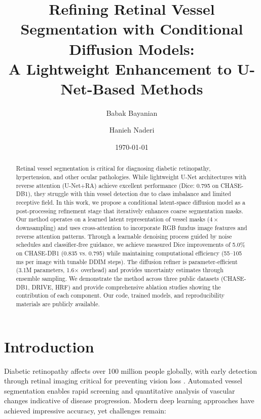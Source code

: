 \documentclass[11pt]{article}
\title{Refining Retinal Vessel Segmentation with Conditional Diffusion Models: \\
A Lightweight Enhancement to U-Net-Based Methods}
\author{Babak Bayanian \and Hanieh Naderi}
\date{\today}
\begin{document}
\maketitle

\begin{abstract}
Retinal vessel segmentation is critical for diagnosing diabetic retinopathy, hypertension, and other ocular pathologies. While lightweight U-Net architectures with reverse attention (U-Net+RA) achieve excellent performance (Dice: 0.795 on CHASE-DB1), they struggle with thin vessel detection due to class imbalance and limited receptive field. In this work, we propose a conditional latent-space diffusion model as a post-processing refinement stage that iteratively enhances coarse segmentation masks. Our method operates on a learned latent representation of vessel masks ($4\times$ downsampling) and uses cross-attention to incorporate RGB fundus image features and reverse attention patterns. Through a learnable denoising process guided by noise schedules and classifier-free guidance, we achieve measured Dice improvements of 5.0\% on CHASE-DB1 (0.835 vs. 0.795) while maintaining computational efficiency (55--105 ms per image with tunable DDIM steps). The diffusion refiner is parameter-efficient (3.1M parameters, 1.6$\times$ overhead) and provides uncertainty estimates through ensemble sampling. We demonstrate the method across three public datasets (CHASE-DB1, DRIVE, HRF) and provide comprehensive ablation studies showing the contribution of each component. Our code, trained models, and reproducibility materials are publicly available.
\end{abstract}

\section{Introduction}

Diabetic retinopathy affects over 100 million people globally, with early detection through retinal imaging critical for preventing vision loss \cite{WHO2021}. Automated vessel segmentation enables rapid screening and quantitative analysis of vascular changes indicative of disease progression. Modern deep learning approaches have achieved impressive accuracy, yet challenges remain:
\end{document}
